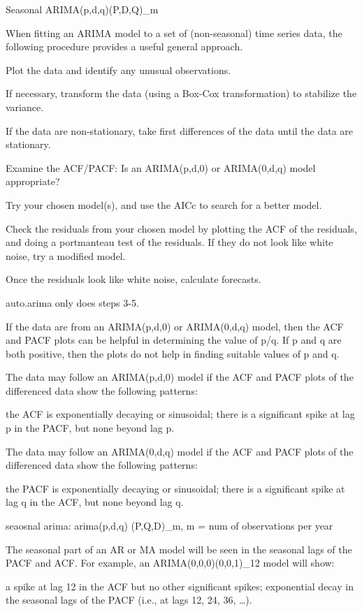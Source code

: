 \documentclass[]{book}
\begin{document}
Seasonal ARIMA(p,d,q)(P,D,Q)\_m

When fitting an ARIMA model to a set of (non-seasonal) time series data,
the following procedure provides a useful general approach.

Plot the data and identify any unusual observations.

If necessary, transform the data (using a Box-Cox transformation) to
stabilize the variance.

If the data are non-stationary, take first differences of the data until
the data are stationary.

Examine the ACF/PACF: Is an ARIMA(p,d,0) or ARIMA(0,d,q) model
appropriate?

Try your chosen model(s), and use the AICc to search for a better model.

Check the residuals from your chosen model by plotting the ACF of the
residuals, and doing a portmanteau test of the residuals. If they do not
look like white noise, try a modified model.

Once the residuals look like white noise, calculate forecasts.

auto.arima only does steps 3-5.

If the data are from an ARIMA(p,d,0) or ARIMA(0,d,q) model, then the ACF
and PACF plots can be helpful in determining the value of p/q. If p and
q are both positive, then the plots do not help in finding suitable
values of p and q.

The data may follow an ARIMA(p,d,0) model if the ACF and PACF plots of
the differenced data show the following patterns:

the ACF is exponentially decaying or sinusoidal; there is a significant
spike at lag p in the PACF, but none beyond lag p.

The data may follow an ARIMA(0,d,q) model if the ACF and PACF plots of
the differenced data show the following patterns:

the PACF is exponentially decaying or sinusoidal; there is a significant
spike at lag q in the ACF, but none beyond lag q.

seaosnal arima: arima(p,d,q) (P,Q,D)\_m, m = num of observations per
year

The seasonal part of an AR or MA model will be seen in the seasonal lags
of the PACF and ACF. For example, an ARIMA(0,0,0)(0,0,1)\_12 model will
show:

a spike at lag 12 in the ACF but no other significant spikes;
exponential decay in the seasonal lags of the PACF (i.e., at lags 12,
24, 36, \ldots{}).
\end{document}
